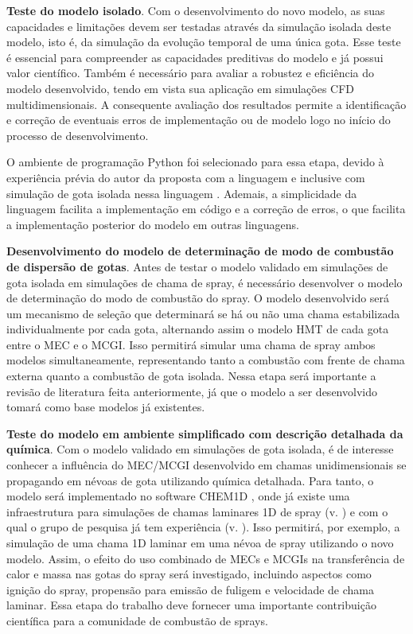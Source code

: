 \textbf{Teste do modelo isolado}.
Com o desenvolvimento do novo modelo, as suas capacidades e limitações devem ser testadas através da simulação isolada deste modelo, isto é, da simulação da evolução temporal de uma única gota. %
Esse teste é essencial para compreender as capacidades preditivas do modelo e já possui valor científico. Também é necessário para avaliar a robustez e eficiência do modelo desenvolvido, tendo em vista sua aplicação em simulações CFD multidimensionais.
A consequente avaliação dos resultados permite a identificação e correção de eventuais erros de implementação ou de modelo logo no início do processo de desenvolvimento.

O ambiente de programação Python foi selecionado para essa etapa, devido à experiência prévia do autor da proposta com a linguagem e inclusive com simulação de gota isolada nessa linguagem \cite{HenningsJ2024MT}.
Ademais, a simplicidade da linguagem facilita a implementação em código e a correção de erros, o que facilita a implementação posterior do modelo em outras linguagens.

\textbf{Desenvolvimento do modelo de determinação de modo de combustão de dispersão de gotas}.
Antes de testar o modelo validado em simulações de gota isolada em simulações de chama de spray, é necessário desenvolver o modelo de determinação do modo de combustão do spray.
O modelo desenvolvido será um mecanismo de seleção que determinará se há ou não uma chama estabilizada individualmente por cada gota, alternando assim o modelo HMT de cada gota entre o MEC e o MCGI.
Isso permitirá simular uma chama de spray ambos modelos simultaneamente, representando tanto a combustão com frente de chama externa quanto a combustão de gota isolada.
Nessa etapa será importante a revisão de literatura feita anteriormente, já que o modelo a ser desenvolvido tomará como base modelos já existentes.


\textbf{Teste do modelo em ambiente simplificado com descrição detalhada da química}.
Com o modelo validado em simulações de gota isolada, é de interesse conhecer a influência do MEC/MCGI desenvolvido em chamas unidimensionais se propagando em névoas de gota utilizando química detalhada.
Para tanto, o modelo será implementado no software CHEM1D \cite{Sommers1994PhD}, onde já existe uma infraestrutura para simulações de chamas laminares 1D de spray (v. \cite{Sommers1994PhD,vanOijen2002CTM,vanOijen2016PECS, SacomanoF2018CTM,SacomanoF2021Fluids}) e com o qual o grupo de pesquisa já tem experiência (v. \cite{SacomanoF2018CTM,SacomanoF2019IJHMT,SacomanoF2021Fluids,SacomanoF2024CF,SacomanoF2025CF}).
Isso permitirá, por exemplo, a simulação de uma chama 1D laminar em uma névoa de spray utilizando o novo modelo.
Assim, o efeito do uso combinado de MECs e MCGIs na transferência de calor e massa nas gotas do spray será investigado, incluindo aspectos como ignição do spray, propensão para emissão de fuligem e velocidade de chama laminar.
Essa etapa do trabalho deve fornecer uma importante contribuição científica para a comunidade de combustão de sprays.


